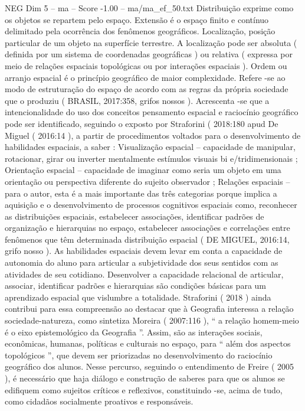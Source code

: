 \begin{textsample}{NEG Dim 5 – ma – Score -1.00 – ma/ma\_ef\_50.txt}
Distribuição exprime como os objetos se repartem pelo espaço.
Extensão é o espaço finito e contínuo delimitado pela ocorrência dos fenômenos geográficos.
Localização, posição particular de um objeto na superfície terrestre.
A localização pode ser absoluta ( definida por um sistema de coordenadas geográficas ) ou relativa ( expressa por meio de relações espaciais topológicas ou por interações espaciais ).
Ordem ou arranjo espacial é o princípio geográfico de maior complexidade.
Refere -se ao modo de estruturação do espaço de acordo com as regras da própria sociedade que o produziu ( BRASIL, 2017:358, grifos nossos ).
Acrescenta -se que a intencionalidade do uso dos conceitos pensamento espacial e raciocínio geográfico pode ser identificado, seguindo o exposto por Straforini ( 2018:180 apud De Miguel ( 2016:14 ), a partir de procedimentos voltados para o desenvolvimento de habilidades espaciais, a saber : Visualização espacial – capacidade de manipular, rotacionar, girar ou inverter mentalmente estímulos visuais bi e/tridimensionais ; Orientação espacial – capacidade de imaginar como seria um objeto em uma orientação ou perspectiva diferente do sujeito observador ; Relações espaciais – para o autor, esta é a mais importante das três categorias porque implica a aquisição e o desenvolvimento de processos cognitivos espaciais como, reconhecer as distribuições espaciais, estabelecer associações, identificar padrões de organização e hierarquias no espaço, estabelecer associações e correlações entre fenômenos que têm determinada distribuição espacial ( DE MIGUEL, 2016:14, grifo nosso ).
As habilidades espaciais devem levar em conta a capacidade de autonomia do aluno para articular a subjetividade dos seus sentidos com as atividades de seu cotidiano.
Desenvolver a capacidade relacional de articular, associar, identificar padrões e hierarquias são condições básicas para um aprendizado espacial que vislumbre a totalidade.
Straforini ( 2018 ) ainda contribui para essa compreensão ao destacar que à Geografia interessa a relação sociedade-natureza, como sintetiza Moreira ( 2007:116 ), “ a relação homem-meio é o eixo epistemológico da Geografia ”.
Assim, são as interações sociais, econômicas, humanas, políticas e culturais no espaço, para “ além dos aspectos topológicos ”, que devem ser priorizadas no desenvolvimento do raciocínio geográfico dos alunos.
Nesse percurso, seguindo o entendimento de Freire ( 2005 ), é necessário que haja diálogo e construção de saberes para que os alunos se edifiquem como sujeitos críticos e reflexivos, constituindo -se, acima de tudo, como cidadãos socialmente proativos e responsáveis.

\end{textsample}
